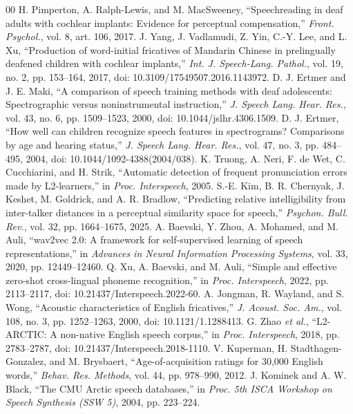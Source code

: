 \documentclass[conference]{IEEEtran}
\begin{document}
\begin{thebibliography}{00}
 H. Pimperton, A. Ralph-Lewis, and M. MacSweeney, ``Speechreading in deaf adults with cochlear implants: Evidence for perceptual compensation,'' \textit{Front. Psychol.}, vol. 8, art. 106, 2017.
 J. Yang, J. Vadlamudi, Z. Yin, C.-Y. Lee, and L. Xu, ``Production of word-initial fricatives of Mandarin Chinese in prelingually deafened children with cochlear implants,'' \textit{Int. J. Speech-Lang. Pathol.}, vol. 19, no. 2, pp. 153--164, 2017, doi: 10.3109/17549507.2016.1143972.
 D. J. Ertmer and J. E. Maki, ``A comparison of speech training methods with deaf adolescents: Spectrographic versus noninstrumental instruction,'' \textit{J. Speech Lang. Hear. Res.}, vol. 43, no. 6, pp. 1509--1523, 2000, doi: 10.1044/jslhr.4306.1509.
 D. J. Ertmer, ``How well can children recognize speech features in spectrograms? Comparisons by age and hearing status,'' \textit{J. Speech Lang. Hear. Res.}, vol. 47, no. 3, pp. 484--495, 2004, doi: 10.1044/1092-4388(2004/038).
 K. Truong, A. Neri, F. de Wet, C. Cucchiarini, and H. Strik, ``Automatic detection of frequent pronunciation errors made by L2-learners,'' in \textit{Proc. Interspeech}, 2005.
 S.-E. Kim, B. R. Chernyak, J. Keshet, M. Goldrick, and A. R. Bradlow, ``Predicting relative intelligibility from inter-talker distances in a perceptual similarity space for speech,'' \textit{Psychon. Bull. Rev.}, vol. 32, pp. 1664--1675, 2025.
 A. Baevski, Y. Zhou, A. Mohamed, and M. Auli, ``wav2vec 2.0: A framework for self-supervised learning of speech representations,'' in \textit{Advances in Neural Information Processing Systems}, vol. 33, 2020, pp. 12449--12460.
 Q. Xu, A. Baevski, and M. Auli, ``Simple and effective zero-shot cross-lingual phoneme recognition,'' in \textit{Proc. Interspeech}, 2022, pp. 2113--2117, doi: 10.21437/Interspeech.2022-60.
 A. Jongman, R. Wayland, and S. Wong, ``Acoustic characteristics of English fricatives,'' \textit{J. Acoust. Soc. Am.}, vol. 108, no. 3, pp. 1252--1263, 2000, doi: 10.1121/1.1288413.
 G. Zhao \textit{et al.}, ``L2-ARCTIC: A non-native English speech corpus,'' in \textit{Proc. Interspeech}, 2018, pp. 2783--2787, doi: 10.21437/Interspeech.2018-1110.
 V. Kuperman, H. Stadthagen-Gonzalez, and M. Brysbaert, ``Age-of-acquisition ratings for 30,000 English words,'' \textit{Behav. Res. Methods}, vol. 44, pp. 978--990, 2012.
 J. Kominek and A. W. Black, ``The CMU Arctic speech databases,'' in \textit{Proc. 5th ISCA Workshop on Speech Synthesis (SSW 5)}, 2004, pp. 223--224.
\end{thebibliography}
\end{document}
